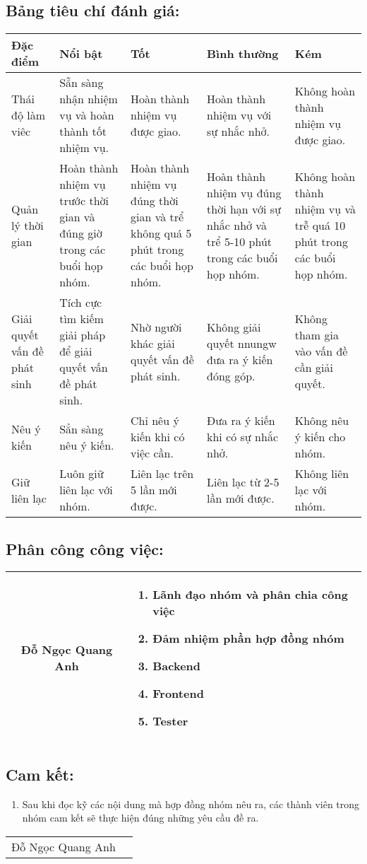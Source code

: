 \documentclass[a4paper,14pt]{extreport}
\begin{document}
\subsection{ Bảng tiêu chí đánh giá:}
\begin{tabular}{| p{2.5cm}| p{3cm} |p{3cm} |p{3cm} |p{3cm}|}
     \hline
    Đặc điểm& Nổi bật& Tốt& Bình thường& Kém \\
    \hline
    Thái độ làm viêc& Sẵn sàng nhận nhiệm vụ và hoàn thành tốt nhiệm vụ.& Hoàn thành nhiệm vụ được giao.& Hoàn thành nhiệm vụ với sự nhắc nhở.& Không hoàn thành nhiệm vụ được giao.\\
    \hline
    Quản lý thời gian& Hoàn thành nhiệm vụ trước thời gian và đúng giờ trong các buổi họp nhóm.& Hoàn thành nhiệm vụ đúng thời gian và trể  không  quá 5 phút trong các buổi họp nhóm.& Hoàn thành nhiệm vụ đúng thời hạn với sự nhắc nhở và trể 5-10 phút trong các buổi họp nhóm.& Không hoàn thành nhiệm vụ và trễ quá 10 phút trong các buổi họp nhóm.\\
    \hline
    Giải quyết vấn đề phát sinh& Tích cực tìm kiếm giải pháp để giải quyết vấn đề phát sinh.& Nhờ người khác giải quyết vấn đề phát sinh.& Không giải quyết nnungw đưa ra ý kiến đóng góp.& Không tham gia vào vấn đề cần giải quyết.\\   
    \hline
    Nêu ý kiến& Sẳn sàng nêu ý kiến.& Chỉ nêu ý  kiến khi có việc cần.& Đưa ra ý kiến khi có sự nhắc nhở.& Không nêu ý kiến cho nhóm.\\
    \hline
    Giữ liên lạc& Luôn giữ liên lạc với nhóm.& Liên lạc trên 5 lần mới được.& Liên lạc từ 2-5 lần mới được.& Không liên lạc với nhóm.\\
    \hline
    
\end{tabular}
\subsection{ Phân công công việc:}
\begin{tabular}{|c | p{10cm}|}
     \hline 
     Đỗ Ngọc Quang Anh& \begin{enumerate}[-]
        \item Lãnh đạo nhóm và phân chia công việc 
        \item Đảm nhiệm phần hợp đồng nhóm
        \item Backend
        \item Frontend
        \item Tester
     \end{enumerate}\\
     \hline
\end{tabular}
\subsection{ Cam kết:}
\begin {enumerate}[-]
\item Sau khi đọc kỹ các nội dung mà hợp đồng nhóm nêu ra, các thành viên trong nhóm cam kết sẽ thực hiện đúng những yêu cầu đề ra.

\end{enumerate}

\begin{tabular}{p{10cm} p{4cm}}
Đỗ Ngọc Quang Anh
\end{tabular}
\newpage
\end{document}
